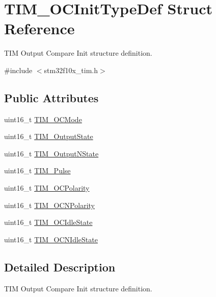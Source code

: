 \hypertarget{structTIM__OCInitTypeDef}{
\section{TIM\_\-OCInitTypeDef Struct Reference}
\label{structTIM__OCInitTypeDef}
}


TIM Output Compare Init structure definition.  




{\ttfamily \#include $<$stm32f10x\_\-tim.h$>$}

\subsection*{Public Attributes}
\begin{DoxyCompactItemize}
\item 
uint16\_\-t \hyperlink{structTIM__OCInitTypeDef_ad4338ed2415b0d6d19589bf72b7ba3b0}{TIM\_\-OCMode}
\item 
uint16\_\-t \hyperlink{structTIM__OCInitTypeDef_a2baca9c02d214d3125635a74e8d9aee4}{TIM\_\-OutputState}
\item 
uint16\_\-t \hyperlink{structTIM__OCInitTypeDef_a933904d2f892d0b945a908b9257fe869}{TIM\_\-OutputNState}
\item 
uint16\_\-t \hyperlink{structTIM__OCInitTypeDef_a186a3729af4e52f73f96590d805412a3}{TIM\_\-Pulse}
\item 
uint16\_\-t \hyperlink{structTIM__OCInitTypeDef_a9ed3e2de4700d008729a916d8ba78486}{TIM\_\-OCPolarity}
\item 
uint16\_\-t \hyperlink{structTIM__OCInitTypeDef_a3e47e672810747302c9d0626ae2ccb17}{TIM\_\-OCNPolarity}
\item 
uint16\_\-t \hyperlink{structTIM__OCInitTypeDef_a2a28f2d62339e06caef12816e04a8f55}{TIM\_\-OCIdleState}
\item 
uint16\_\-t \hyperlink{structTIM__OCInitTypeDef_a6cbbe6eb87c2ab49e4d68fa9703ce949}{TIM\_\-OCNIdleState}
\end{DoxyCompactItemize}


\subsection{Detailed Description}
TIM Output Compare Init structure definition. 

